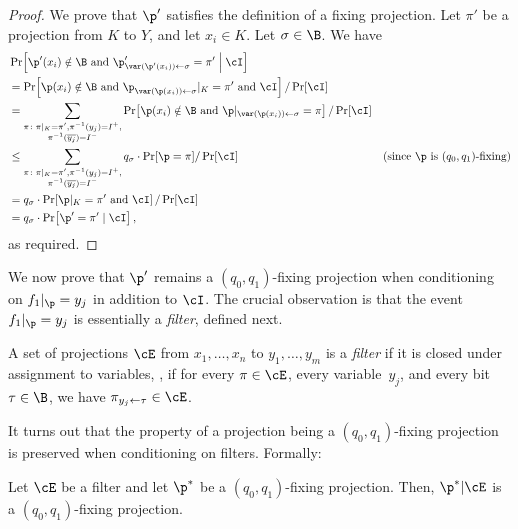 \begin{proof}
We prove that $\p'$ satisfies the definition of a fixing projection.
Let $\pi'$ be a projection from $K$ to $Y$, and let $x_{i}\in K$.
Let $\sigma\in\B$. We have 
\begin{align*}
 & \Pr\!\left[\p'(x_{i})\notin\B\text{ and }\p'_{\var(\p'(x_{i}))\gets\sigma}=\pi'\;\middle|\;\cI\right]\\
 & =\Pr\!\left[\p(x_{i})\notin\B\text{ and }\p_{\var(\p(x_{i}))\gets\sigma}|_{K}=\pi'\text{ and }\cI\right]/\Pr\!\left[\cI\right]\\
 & =\sum_{\substack{\pi\colon\pi|_{K}=\pi',\pi^{-1}(y_{j})=I^{+},\\
\pi^{-1}(\overline{y_{j}})=I^{-}
}
}\Pr\!\left[\p(x_{i})\notin\B\text{ and }\p|_{\var(\p(x_{i}))\gets\sigma}=\pi\right]/\Pr\!\left[\cI\right]\\
 & \le\sum_{\substack{\pi\colon\pi|_{K}=\pi',\pi^{-1}(y_{j})=I^{+},\\
\pi^{-1}(\overline{y_{j}})=I^{-}
}
}q_{\sigma}\cdot\Pr[\p=\pi]/\Pr\!\left[\cI\right] & \text{(since \ensuremath{\p} is \ensuremath{(q_{0},q_{1})}-fixing)}\\
 & =q_{\sigma}\cdot\Pr\!\left[\p|_{K}=\pi'\text{ and }\cI\right]/\Pr\!\left[\cI\right]\\
 & =q_{\sigma}\cdot\Pr\!\left[\p'=\pi'\mid\cI\right],
\end{align*}
as required. 
\end{proof}
We now prove that $\p'$ remains a $(q_{0},q_{1})$-fixing projection
when conditioning on $f_{1}|_{\p}=y_{j}$ in addition to $\cI$. The
crucial observation is that the event $f_{1}|_{\p}=y_{j}$ is essentially
a \emph{filter}, defined next. 
\begin{definition}
A set of projections $\cE$ from $x_{1},\ldots,x_{n}$ to $y_{1},\ldots,y_{m}$
is a \emph{filter} if it is closed under assignment to variables,
\ie, if for every $\pi\in\cE$, every variable~$y_{j}$, and every
bit~$\tau\in\B$, we have $\pi_{y_{j}\gets\tau}\in\cE$. 
\end{definition}

It turns out that the property of a projection being a $(q_{0},q_{1})$-fixing
projection is preserved when conditioning on filters. Formally: 
\begin{proposition}
\label{prop:conditioning-on-a-filter}Let $\cE$ be a filter and let $\p^{*}$
be a $(q_{0},q_{1})$-fixing projection. Then, $\p^{*}|\cE$ is a
$(q_{0},q_{1})$-fixing projection. 
\end{proposition}

